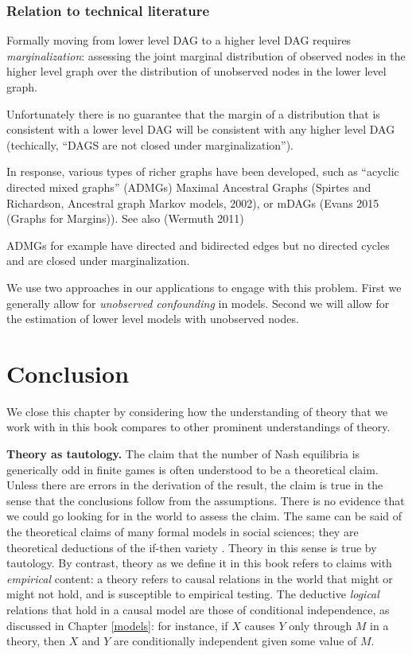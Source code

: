 \documentclass[12pt,]{book}
\begin{document}
\hypertarget{relation-to-technical-literature}{%
\subsubsection{Relation to technical literature}\label{relation-to-technical-literature}}

Formally moving from lower level DAG to a higher level DAG requires \emph{marginalization}: assessing the joint marginal distribution of observed nodes in the higher level graph over the distribution of unobserved nodes in the lower level graph.

Unfortunately there is no guarantee that the margin of a distribution that is consistent with a lower level DAG will be consistent with any higher level DAG (techically, ``DAGS are not closed under marginalization'').

In response, various types of richer graphs have been developed, such as ``acyclic directed mixed graphs'' (ADMGs) Maximal Ancestral Graphs (Spirtes and Richardson, Ancestral graph Markov models, 2002), or mDAGs (Evans 2015 (Graphs for Margins)). See also (Wermuth 2011)

ADMGs for example have directed and bidirected edges but no directed cycles and are closed under marginalization.

We use two approaches in our applications to engage with this problem. First we generally allow for \emph{unobserved confounding} in models. Second we will allow for the estimation of lower level models with unobserved nodes.

\hypertarget{conclusion}{%
\section{Conclusion}\label{conclusion}}

We close this chapter by considering how the understanding of theory that we work with in this book compares to other prominent understandings of theory.

\textbf{Theory as tautology.} The claim that the number of Nash equilibria is generically odd in finite games is often understood to be a theoretical claim. Unless there are errors in the derivation of the result, the claim is true in the sense that the conclusions follow from the assumptions. There is no evidence that we could go looking for in the world to assess the claim. The same can be said of the theoretical claims of many formal models in social sciences; they are theoretical deductions of the if-then variety \citep{clarke2012model}. Theory in this sense is true by tautology. By contrast, theory as we define it in this book refers to claims with \emph{empirical} content: a theory refers to causal relations in the world that might or might not hold, and is susceptible to empirical testing. The deductive \emph{logical} relations that hold in a causal model are those of conditional independence, as discussed in Chapter \ref{models}: for instance, if \(X\) causes \(Y\) only through \(M\) in a theory, then \(X\) and \(Y\) are conditionally independent given some value of \(M\).
\end{document}

